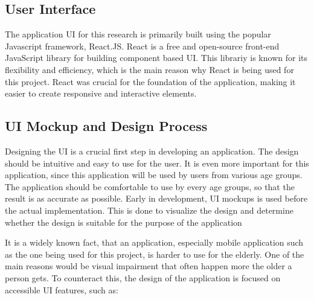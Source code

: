 \subsection{User Interface}


The application \ac{UI} for this research is primarily built using the popular Javascript framework, React.JS.
React is a free and open-source front-end JavaScript library for building component based \ac{UI}.
This librariy is known for its flexibility and efficiency, which is the main reason why React is being used for this project.
React was crucial for the foundation of the application, making it easier to create responsive and interactive elements.  

\subsection{UI Mockup and Design Process}

Designing the \ac{UI} is a crucial first step in developing an application.
The design should be intuitive and easy to use for the user.
It is even more important for this application, since this application will be used by users from various age groups.
The application should be comfortable to use by every age groups, so that the result is as accurate as possible.
Early in development, \ac{UI} mockups is used before the actual implementation.
This is done to visualize the design and determine whether the design is suitable for the purpose of the application

It is a widely known fact, that an application, especially mobile application such as the one being used for this project, is harder to use for the elderly.
One of the main reasons would be visual impairment that often happen more the older a person gets.
To counteract this, the design of the application is focused on accessible \ac{UI} features, such as: